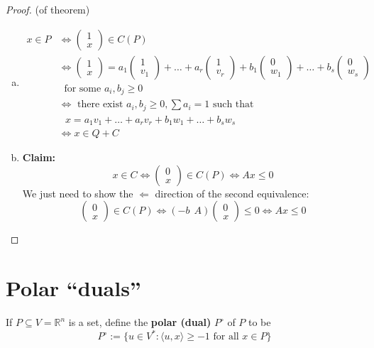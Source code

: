 \documentclass[a4paper,12pt]{amsart}
\begin{document}
\begin{proof}(of theorem)
	\begin{enumerate}[(a)]
		\item
		\begin{align*}
			x\in P &\iff \begin{pmatrix} 1 \\ x \end{pmatrix} \in C(P)\\
			&\iff \begin{pmatrix} 1 \\ x \end{pmatrix} = a_1 \begin{pmatrix} 1 \\ v_1 \end{pmatrix} + \ldots + a_r \begin{pmatrix} 1 \\ v_r \end{pmatrix} + b_1 \begin{pmatrix} 0 \\ w_1\end{pmatrix}+\ldots+b_s \begin{pmatrix} 0 \\ w_s \end{pmatrix}\\
			& \ \text{ for some } a_i, b_j \geq 0\\
			&\iff \text{ there exist } a_i, b_j \geq 0, \sum a_i = 1 \text{ such that } \\
			&\ \ \ x= a_1 v_1+\ldots +a_r v_r + b_1 w_1 + \ldots + b_s w_s\\
			&\iff x \in Q+C
		\end{align*}
		\item {\bf Claim:} 
		\[ x\in C \iff \begin{pmatrix} 0 \\ x \end{pmatrix} \in C(P) \iff Ax \leq 0 \]
		We just need to show the $\Leftarrow$ direction of the second equivalence:
		\[ \begin{pmatrix} 0 \\ x \end{pmatrix} \in C(P) \iff (-b \ \ A)\begin{pmatrix} 0 \\ x \end{pmatrix} \leq 0 \iff Ax \leq 0\]
	\end{enumerate}
\end{proof}

\section{Polar ``duals''}
If $P \subseteq V = \mathbb{R}^n$ is a set, define the {\bf polar (dual)} $P^{\circ}$ of $P$ to be 
\[P^{\circ} := \{u \in V^{*} : \langle u ,x \rangle \geq -1 \text{ for all } x\in P\}\]
\end{document}

